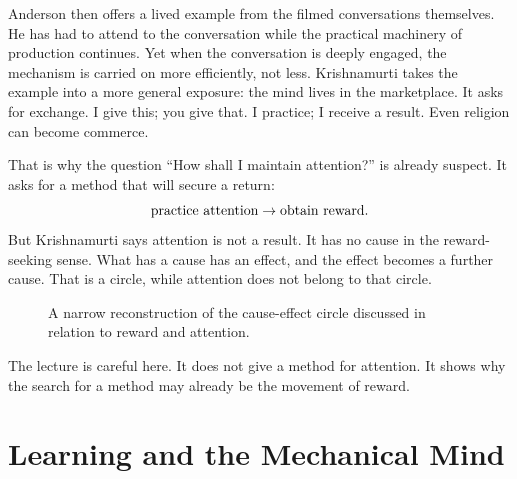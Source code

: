 Anderson then offers a lived example from the filmed conversations themselves. He has had to attend to the conversation while the practical machinery of production continues. Yet when the conversation is deeply engaged, the mechanism is carried on more efficiently, not less. Krishnamurti takes the example into a more general exposure: the mind lives in the marketplace. It asks for exchange. I give this; you give that. I practice; I receive a result. Even religion can become commerce.

That is why the question ``How shall I maintain attention?'' is already suspect. It asks for a method that will secure a return:
\begin{equation}
\hbox{practice attention}
\to
\hbox{obtain reward}.
\end{equation}
But Krishnamurti says attention is not a result. It has no cause in the reward-seeking sense. What has a cause has an effect, and the effect becomes a further cause. That is a circle, while attention does not belong to that circle.

\begin{figure}
\centering
{}
\caption{A narrow reconstruction of the cause-effect circle discussed in relation to reward and attention.}
\end{figure}

The lecture is careful here. It does not give a method for attention. It shows why the search for a method may already be the movement of reward.

\section{Learning and the Mechanical Mind}

